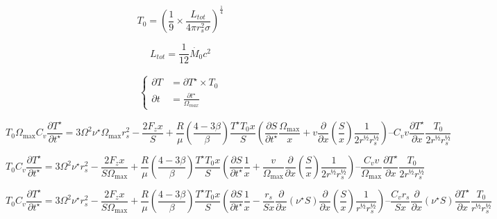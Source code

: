 \begin{equation}
    T_0 = \left(\frac{1}{9} × \frac{L_{tot}}{4 \pi r_s^2 \sigma} \right)^{\frac{1}{4}}
\end{equation}

\begin{equation}
    L_{tot} = \frac{1}{12} \dot{M_0} c^2
\end{equation}

\begin{align}
    \left\{
        \begin{aligned}
            \partial T &= \partial T^{\star} × T_0 \\
            \partial t &= \frac{\partial t^{\star}}{\Omega_{max}}
        \end{aligned}
    \right.
\end{align}

\begin{equation}
    T_0 \Omega_\mathrm{max} C_v \frac{\partial T^{\star}}{\partial t^{\star}} =
    3 \Omega^2 \nu^\star \Omega_\mathrm{max} r_s^2 − \frac{2 F_z x}{S} +
    \frac{R}{\mu} \left(\frac{4−3\beta}{\beta}\right) \frac{T^\star T_0 x}{S}
    \left( \frac{\partial S}{\partial t^\star} \frac{\Omega_\mathrm{max}}{x} + v \frac{\partial}{\partial x} \left(\frac{S}{x}\right) \frac{1}{2 r^½ r_s^½}  \right) –
    C_v v \frac{\partial T^\star}{\partial x} \frac{T_0}{2 r^½ r_s^½}
\end{equation}

\begin{equation}
    T_0 C_v \frac{\partial T^{\star}}{\partial t^{\star}} =
    3 \Omega^2 \nu^\star r_s^2 − \frac{2 F_z x}{S \Omega_\mathrm{max}} +
    \frac{R}{\mu} \left(\frac{4−3\beta}{\beta}\right) \frac{T^\star T_0 x}{S}
    \left( \frac{\partial S}{\partial t^\star} \frac{1}{x} + \frac{v}{\Omega_\mathrm{max}} \frac{\partial}{\partial x} \left(\frac{S}{x}\right) \frac{1}{2 r^½ r_s^½}  \right) –
    \frac{C_v v}{\Omega_\mathrm{max}} \frac{\partial T^\star}{\partial x} \frac{T_0}{2 r^½ r_s^½}
\end{equation}

\begin{equation}
    T_0 C_v \frac{\partial T^{\star}}{\partial t^{\star}} =
    3 \Omega^2 \nu^\star r_s^2 − \frac{2 F_z x}{S \Omega_\mathrm{max}} +
    \frac{R}{\mu} \left(\frac{4−3\beta}{\beta}\right) \frac{T^\star T_0 x}{S}
    \left( \frac{\partial S}{\partial t^\star} \frac{1}{x} − \frac{r_s}{S x} \frac{\partial}{\partial x} \left(\nu^\star S\right) \frac{\partial}{\partial x} \left(\frac{S}{x}\right) \frac{1}{r^½ r_s^½}  \right) –
    \frac{C_v r_s}{S x} \frac{\partial}{\partial x} \left(\nu^\star S\right) \frac{\partial T^\star}{\partial x} \frac{T_0}{r^½ r_s^½}
\end{equation}

